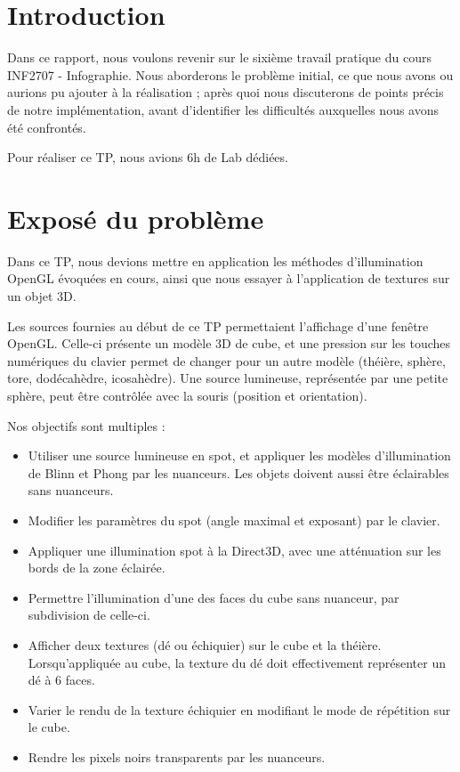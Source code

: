 \documentclass[10pt,a4paper]{article}
\begin{document}
\newpage

\hfill

\newpage

\tableofcontents

\newpage

\section{Introduction}

Dans ce rapport, nous voulons revenir sur le sixième travail pratique du cours INF2707 - Infographie. Nous aborderons le problème initial, ce que nous avons ou aurions pu ajouter à la réalisation ; après quoi nous discuterons de points précis de notre implémentation, avant d'identifier les difficultés auxquelles nous avons été confrontés.

Pour réaliser ce TP, nous avions 6h de Lab dédiées.

\section{Exposé du problème}

Dans ce TP, nous devions mettre en application les méthodes d'illumination OpenGL évoquées en cours, ainsi que nous essayer à l'application de textures sur un objet 3D.

Les sources fournies au début de ce TP permettaient l'affichage d'une fenêtre OpenGL. Celle-ci présente un modèle 3D de cube, et une pression sur les touches numériques du clavier permet de changer pour un autre modèle (théière, sphère, tore, dodécahèdre, icosahèdre). Une source lumineuse, représentée par une petite sphère, peut être contrôlée avec la souris (position et orientation).

Nos objectifs sont multiples :

\begin{itemize}
	\item Utiliser une source lumineuse en spot, et appliquer les modèles d'illumination de Blinn et Phong par les nuanceurs. Les objets doivent aussi être éclairables sans nuanceurs.
	\item Modifier les paramètres du spot (angle maximal et exposant) par le clavier.
	\item Appliquer une illumination spot à la Direct3D, avec une atténuation sur les bords de la zone éclairée.
	\item Permettre l'illumination d'une des faces du cube sans nuanceur, par subdivision de celle-ci.
	\item Afficher deux textures (dé ou échiquier) sur le cube et la théière. Lorsqu'appliquée au cube, la texture du dé doit effectivement représenter un dé à 6 faces.
	\item Varier le rendu de la texture échiquier en modifiant le mode de répétition sur le cube.
	\item Rendre les pixels noirs transparents par les nuanceurs.
\end{itemize}
\end{document}
